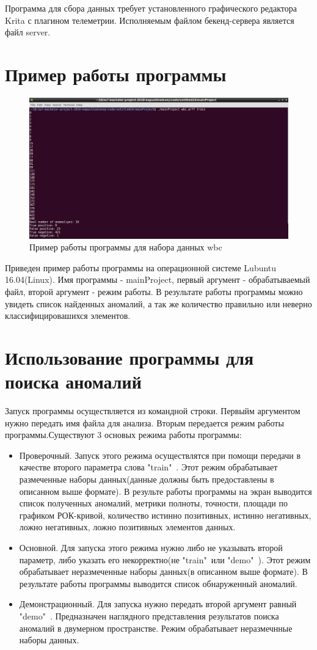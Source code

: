 Программа для сбора данных требует установленного графического редактора Krita с плагином  телеметрии.
Исполняемым файлом бекенд-сервера является файл server.
\section{Пример работы программы}
\begin{figure}[!h]
	\centering
	\includegraphics[width=.8\textwidth]{img/screenPr.png}
	\caption{Пример работы программы для набора данных wbc}
	\label{fig10}
\end{figure}
Приведен пример работы программы на операционной системе Lubuntu 16.04(Linux). Имя программы - mainProject, первый аргумент - обрабатываемый файл, второй аргумент - режим работы. В результате работы программы можно увидеть список найденных аномалий, а так же количество правильно или неверно классифицировашихся элементов.
\section{Использование программы для поиска аномалий}
Запуск программы осуществляется из командной строки. Первыйм аргументом
нужно передать имя файла для анализа. Вторым передается режим работы программы.Существуют 3 основых режима работы программы:
\begin{itemize}
	\item Проверочный. Запуск этого режима осуществлятся при помощи передачи в качестве второго параметра слова "train"\ .
	Этот режим обрабатывает размеченные наборы данных(данные должны быть предоставлены в описанном выше формате). В результе работы программы на экран выводится список полученных аномалий, метрики полноты, точности, площади по графиком РОК-кривой, количество истинно позитивных, истинно негативных, ложно негативных, ложно позитивных элементов данных.
	\item Основной. Для запуска этого режима нужно либо не указывать второй параметр, либо указать его некорректно(не "train"\ или "demo"\ ). Этот режим обрабатывает неразмеченные наборы данных(в описанном выше формате). В результате работы  программы выводится список обнаруженный аномалий.
	\item Демонстрационный. Для запуска нужно передать второй аргумент равный "demo"\ . Предназначен наглядного представления результатов поиска аномалий в двумерном пространстве. Режим обрабатывает неразмечнные наборы данных. 
\end{itemize}
